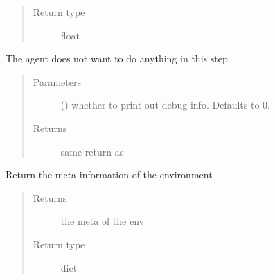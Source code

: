 \documentclass[letterpaper,10pt,english]{sphinxmanual}
\begin{document}
\begin{fulllineitems}
\begin{fulllineitems}
\begin{quote}
\begin{description}
\item[{Return type}] \leavevmode
\sphinxAtStartPar
float

\end{description}\end{quote}

\end{fulllineitems}


\begin{fulllineitems}
\label{\detokenize{CryptoEnv:crypto_env.core.CryptoEnv.hold}}
\sphinxAtStartPar
The agent does not want to do anything in this step
\begin{quote}\begin{description}
\item[{Parameters}] \leavevmode
\sphinxAtStartPar
{} (\sphinxstyleliteralemphasis{\sphinxupquote{, }}) \textendash{} whether to print out debug info. Defaults to 0.

\item[{Returns}] \leavevmode
\sphinxAtStartPar
same return as {\hyperref[\detokenize{CryptoEnv:crypto_env.core.CryptoEnv.step}]{}}

\end{description}\end{quote}

\end{fulllineitems}


\begin{fulllineitems}
\label{\detokenize{CryptoEnv:crypto_env.core.CryptoEnv.meta}}
\sphinxAtStartPar
Return the meta information of the environment
\begin{quote}\begin{description}
\item[{Returns}] \leavevmode
\sphinxAtStartPar
the meta of the env

\item[{Return type}] \leavevmode
\sphinxAtStartPar
dict


\end{description}
\end{quote}
\end{fulllineitems}
\end{fulllineitems}
\end{document}
